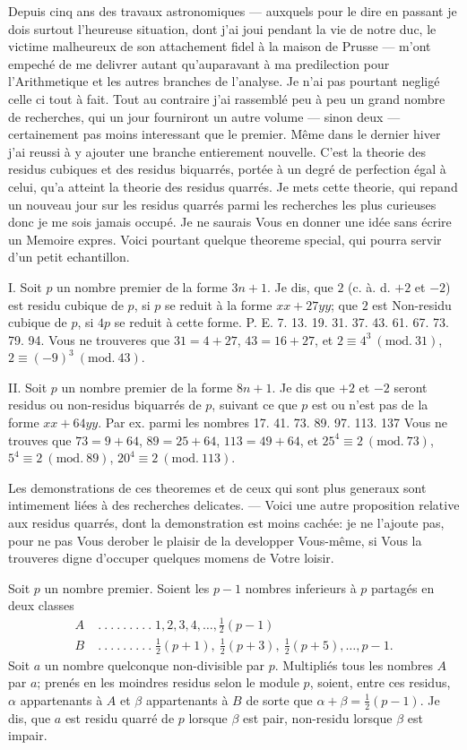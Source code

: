 Depuis cinq ans des travaux astronomiques — auxquels pour le dire en
passant je dois surtout l’heureuse situation, dont j’ai joui pendant la vie de
notre duc, le victime malheureux de son attachement fidel à la maison de
Prusse — m’ont empeché de me delivrer autant qu’auparavant à ma predilection
pour l’Arithmetique et les autres branches de l’analyse. Je n’ai pas
pourtant negligé celle ci tout à fait. Tout au contraire j’ai rassemblé peu à
peu un grand nombre de recherches, qui un jour fourniront un autre volume
— sinon deux — certainement pas moins interessant que le premier. Même
dans le dernier hiver j’ai reussi à y ajouter une branche entierement nouvelle.
C’est la theorie des residus cubiques et des residus biquarrés, portée à un
degré de perfection égal à celui, qu’a atteint la theorie des residus quarrés.
Je mets cette theorie, qui repand un nouveau jour sur les residus quarrés
parmi les recherches les plus curieuses donc je me sois jamais occupé. Je
ne saurais Vous en donner une idée sans écrire un Memoire expres. Voici
pourtant quelque theoreme special, qui pourra servir d’un petit echantillon.

I. Soit $p$ un nombre premier de la forme $3n+1$. Je dis, que $2$ (c. à. d.
$+2$ et $-2$) est residu cubique de $p$, si $p$ se reduit à la forme $xx+27yy$;
que $2$ est Non-residu cubique de $p$, si $4p$ se reduit à cette forme. P. E. 7.
13. 19. 31. 37. 43. 61. 67. 73. 79. 94. Vous ne trouveres que $31=4+27$,
$43=16+27$, et $2\equiv4^3\ (\mathrm{mod.}\ 31)$, $2\equiv(-9)^3\ (\mathrm{mod.}\ 43)$.

II. Soit $p$ un nombre premier de la forme $8n+1$. Je dis que $+2$ et
$-2$ seront residus ou non-residus biquarrés de $p$, suivant ce que $p$ est ou
n’est pas de la forme $xx+64yy$. Par ex. parmi les nombres 17. 41. 73. 89.
97. 113. 137 Vous ne trouves que $73=9+64$, $89=25+64$, $113=49+64$,
et $25^4\equiv2\ (\mathrm{mod.}\ 73)$, $5^4\equiv2\ (\mathrm{mod.}\ 89)$, $20^4\equiv2\ (\mathrm{mod.}\ 113)$.

Les demonstrations de ces theoremes et de ceux qui sont plus generaux
sont intimement liées à des recherches delicates. — Voici une autre proposition
relative aux residus quarrés, dont la demonstration est moins cachée: je ne
l’ajoute pas, pour ne pas Vous derober le plaisir de la developper Vous-même,
si Vous la trouveres digne d’occuper quelques momens de Votre loisir.
\clearpage
{}
\par\indent Soit $p$ un nombre premier. Soient les $p-1$ nombres inferieurs à $p$ partagés
en deux classes
\[
\begin{aligned}
A\;&.\ .\ .\ .\ .\ .\ .\ .\ .\;1,2,3,4,\ldots,\tfrac12(p-1)\\
B\;&.\ .\ .\ .\ .\ .\ .\ .\ .\;\tfrac12(p+1),\ \tfrac12(p+3),\ \tfrac12(p+5),\ldots,p-1.
\end{aligned}
\]
\noindent Soit $a$ un nombre quelconque non-divisible par $p$. Multipliés tous les nombres
$A$ par $a$; prenés en les moindres residus selon le module $p$, soient,
entre ces residus, $\alpha$ appartenants à $A$ et $\beta$ appartenants à $B$ de sorte que
$\alpha+\beta=\tfrac12(p-1)$. Je dis, que $a$ est residu quarré de $p$ lorsque $\beta$ est pair,
non-residu lorsque $\beta$ est impair.

